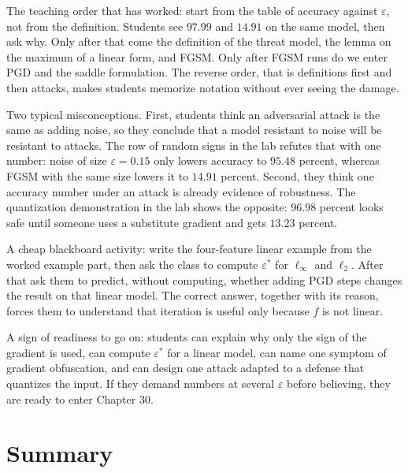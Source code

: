 \begin{untukdosen}
The teaching order that has worked: start from the table of accuracy against
$\varepsilon$, not from the definition. Students see $97.99$ and $14.91$ on the same
model, then ask why. Only after that come the definition of the threat model, the
lemma on the maximum of a linear form, and FGSM. Only after FGSM runs do we enter PGD
and the saddle formulation. The reverse order, that is definitions first and then
attacks, makes students memorize notation without ever seeing the damage.

Two typical misconceptions. First, students think an adversarial attack is the same as
adding noise, so they conclude that a model resistant to noise will be resistant to
attacks. The row of random signs in the lab refutes that with one number: noise of
size $\varepsilon=0.15$ only lowers accuracy to $95.48$ percent, whereas FGSM with the
same size lowers it to $14.91$ percent. Second, they think one accuracy number under
an attack is already evidence of robustness. The quantization demonstration in the lab
shows the opposite: $96.98$ percent looks safe until someone uses a substitute
gradient and gets $13.23$ percent.

A cheap blackboard activity: write the four-feature linear example from the worked
example part, then ask the class to compute $\varepsilon^{*}$ for $\ell_\infty$ and
$\ell_2$. After that ask them to predict, without computing, whether adding PGD steps
changes the result on that linear model. The correct answer, together with its reason,
forces them to understand that iteration is useful only because $f$ is not linear.

A sign of readiness to go on: students can explain why only the sign of the gradient
is used, can compute $\varepsilon^{*}$ for a linear model, can name one symptom of
gradient obfuscation, and can design one attack adapted to a defense that quantizes
the input. If they demand numbers at several $\varepsilon$ before believing, they are
ready to enter Chapter 30.
\end{untukdosen}

\section{Summary}

